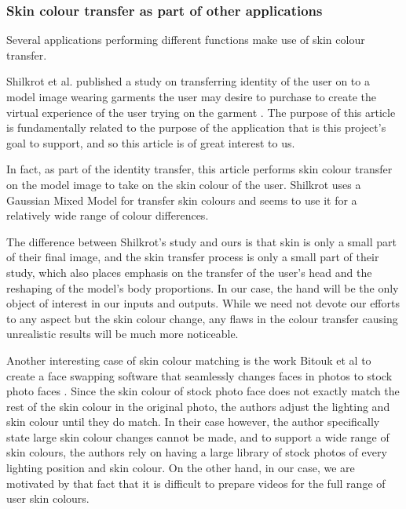 \subsubsection{Skin colour transfer as part of other applications}
Several applications performing different functions make use of skin colour transfer.

Shilkrot et al. published a study on transferring identity of the user on to a model image wearing garments the user may desire to purchase to create the virtual experience of the user trying on the garment \cite{shilkrot_2013_garment}. The purpose of this article is fundamentally related to the purpose of the application that is this project's goal to support, and so this article is of great interest to us. 

In fact, as part of the identity transfer, this article performs skin colour transfer on the model image to take on the skin colour of the user. Shilkrot uses a Gaussian Mixed Model for transfer skin colours and seems to use it for a relatively wide range of colour differences.

The difference between Shilkrot's study and ours is that skin is only a small part of their final image, and the skin transfer process is only a small part of their study, which also places emphasis on the transfer of the user's head and the reshaping of the model's body proportions. In our case, the hand will be the only object of interest in our inputs and outputs. While we need not devote our efforts to any aspect but the skin colour change, any flaws in the colour transfer causing unrealistic results will be much more noticeable. 

Another interesting case of skin colour matching is the work Bitouk et al to create a face swapping software that seamlessly changes faces in photos to stock photo faces \cite{bitouk_2008_faceswap}. Since the skin colour of stock photo face does not exactly match the rest of the skin colour in the original photo, the authors adjust the lighting and skin colour until they do match. In their case however, the author specifically state large skin colour changes cannot be made, and to support a wide range of skin colours, the authors rely on having a large library of stock photos of every lighting position and skin colour. On the other hand, in our case, we are motivated by that fact that it is difficult to prepare videos for the full range of user skin colours.

